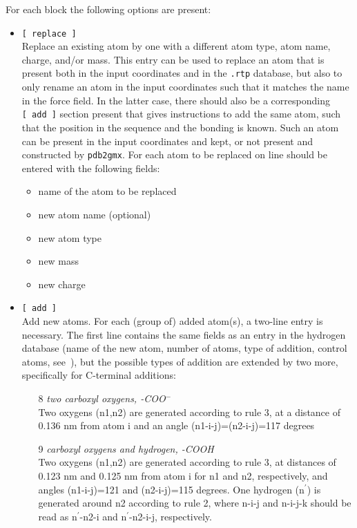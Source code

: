 For each block the following options are present:
\begin{itemize}
\item {\tt [~replace~]} \\
Replace an existing atom by one with a different atom type, atom name,
charge, and/or mass. This entry can be used to replace an atom that is
present both in the input coordinates and in the {\tt .rtp} database,
but also to only rename an atom in the input coordinates such that
it matches the name in the force field. In the latter case, there
should also be a corresponding {\tt [~add~]} section present that
gives instructions to add the same atom, such that the position in the sequence
and the bonding is known. Such an atom can be present in the input
coordinates and kept, or not present and constructed by {\tt pdb2gmx}.
For each atom to be replaced on line should be
entered with the following fields:
\begin{itemize}
\item name of the atom to be replaced
\item new atom name (optional)
\item new atom type
\item new mass
\item new charge
\end{itemize}
\item {\tt [~add~]} \\
Add new atoms. For each (group of) added atom(s), a two-line entry is
necessary. The first line contains the same fields as an entry in the
hydrogen database (name of the new atom, 
number of atoms, type of addition, control atoms,
see~), but the possible types of addition are extended
by two more, specifically for C-terminal additions:
\begin{enumerate}
\item[8]{\em two carboxyl oxygens, -COO{$^-$}}\\
Two oxygens (n1,n2) are generated according to rule 3, at a distance
of 0.136 nm from atom i and an angle (n1-i-j)=(n2-i-j)=117 degrees
\item[9]{\em carboxyl oxygens and hydrogen, -COOH}\\
Two oxygens (n1,n2) are generated according to rule 3, at distances of
0.123 nm and 0.125 nm from atom i for n1 and n2, respectively, and angles
(n1-i-j)=121 and (n2-i-j)=115 degrees. One hydrogen (n$^\prime$) is generated
around n2 according to rule 2, where n-i-j and n-i-j-k should be read
as n$^\prime$-n2-i and n$^\prime$-n2-i-j, respectively.

\end{enumerate}
\end{itemize}
